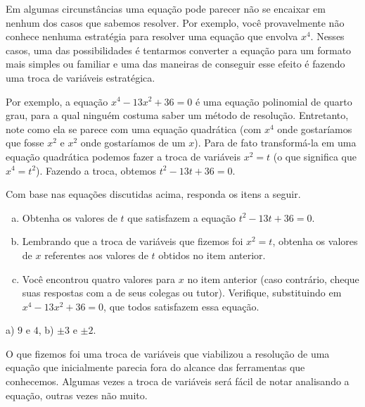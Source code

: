 \documentclass[main.tex]{subfiles}
\begin{document}
Em algumas circunstâncias uma equação pode parecer não se encaixar em nenhum dos casos que sabemos resolver. Por exemplo, você provavelmente não conhece nenhuma estratégia para resolver uma equação que envolva $x^4$. Nesses casos, uma das possibilidades é tentarmos converter a equação para um formato mais simples ou familiar e uma das maneiras de conseguir esse efeito é fazendo uma troca de variáveis estratégica.

Por exemplo, a equação $x^4-13x^2+36=0$ é uma equação polinomial de quarto grau, para a qual ninguém costuma saber um método de resolução. Entretanto, note como ela se parece com uma equação quadrática (com $x^4$ onde gostaríamos que fosse $x^2$ e $x^2$ onde gostaríamos de um $x$). Para de fato transformá-la em uma equação quadrática podemos fazer a troca de variáveis $x^2=t$ (o que significa que $x^4=t^2$). Fazendo a troca, obtemos $t^2-13t+36=0$.

\begin{questao}
Com base nas equações discutidas acima, responda os itens a seguir.
\begin{enumerate}[a)]
\item Obtenha os valores de $t$ que satisfazem a equação $t^2-13t+36=0$.
\item Lembrando que a troca de variáveis que fizemos foi $x^2=t$, obtenha os valores de $x$ referentes aos valores de $t$ obtidos no item anterior.
\item Você encontrou quatro valores para $x$ no item anterior (caso contrário, cheque suas respostas com a de seus colegas ou tutor). Verifique, substituindo em $x^4-13x^2+36=0$, que todos satisfazem essa equação.
\end{enumerate}
\end{questao}


\begin{gabarito}
	\begin{gabaritoQuestao}
		a) $9$ e $4$, b) $\pm3$ e $\pm2$.
	\end{gabaritoQuestao}
\end{gabarito}

O que fizemos foi uma troca de variáveis que viabilizou a resolução de uma equação que inicialmente parecia fora do alcance das ferramentas que conhecemos. Algumas vezes a troca de variáveis será fácil de notar analisando a equação, outras vezes não muito.
\end{document}
